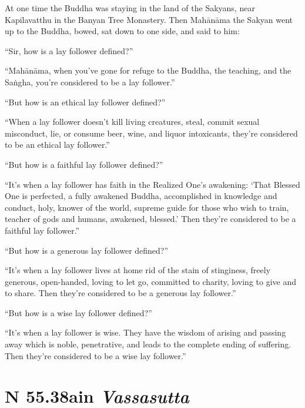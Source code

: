 \documentclass[12pt,openany]{book}%
\newcommand*{\suttatitleacronym}[1]{\smaller[2]{#1}\vspace*{.3em}}
\newcommand*{\suttatitletranslation}[1]{\linebreak{#1}}
\newcommand*{\suttatitleroot}[1]{\linebreak\smaller[2]\itshape{#1}}
\newcommand*{\tocacronym}[1]{\hspace*{-3.3em}{#1}\quad}
\newcommand*{\toctranslation}[1]{#1}
\newcommand*{\tocroot}[1]{(\textit{#1})}
\begin{document}
At one time the Buddha was staying in the land of the Sakyans, near Kapilavatthu in the Banyan Tree Monastery. Then \textsanskrit{Mahānāma} the Sakyan went up to the Buddha, bowed, sat down to one side, and said to him: 

“Sir, how is a lay follower defined?” 

“\textsanskrit{Mahānāma}, when you’ve gone for refuge to the Buddha, the teaching, and the \textsanskrit{Saṅgha}, you’re considered to be a lay follower.” 

“But how is an ethical lay follower defined?” 

“When a lay follower doesn’t kill living creatures, steal, commit sexual misconduct, lie, or consume beer, wine, and liquor intoxicants, they’re considered to be an ethical lay follower.” 

“But how is a faithful lay follower defined?” 

“It’s when a lay follower has faith in the Realized One’s awakening: ‘That Blessed One is perfected, a fully awakened Buddha, accomplished in knowledge and conduct, holy, knower of the world, supreme guide for those who wish to train, teacher of gods and humans, awakened, blessed.’ Then they’re considered to be a faithful lay follower.” 

“But how is a generous lay follower defined?” 

“It’s when a lay follower lives at home rid of the stain of stinginess, freely generous, open-handed, loving to let go, committed to charity, loving to give and to share. Then they’re considered to be a generous lay follower.” 

“But how is a wise lay follower defined?” 

“It’s when a lay follower is wise. They have the wisdom of arising and passing away which is noble, penetrative, and leads to the complete ending of suffering. Then they’re considered to be a wise lay follower.” 

%
\section*{{\suttatitleacronym SN 55.38}{\suttatitletranslation Rain }{\suttatitleroot Vassasutta}}
\addcontentsline{toc}{section}{\tocacronym{SN 55.38} \toctranslation{Rain } \tocroot{Vassasutta}}
\end{document}
